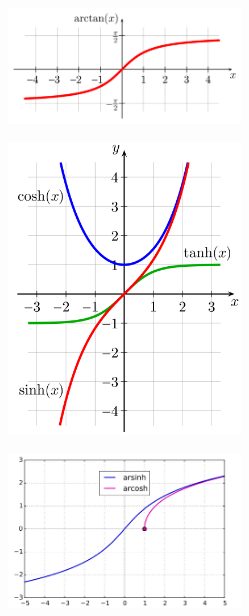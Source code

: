 \begin{figure}[H] 
\centering
    {\includegraphics[width=0.55\textwidth]{images/arctan.png}}
\end{figure}

\begin{figure}[H] 
\centering
    {\includegraphics[width=0.55\textwidth]{images/sinhcoshtanh.png}}
\end{figure}

\begin{figure}[H] 
\centering
    {\includegraphics[width=0.55\textwidth]{images/arsinharcosh.png}}
\end{figure}



